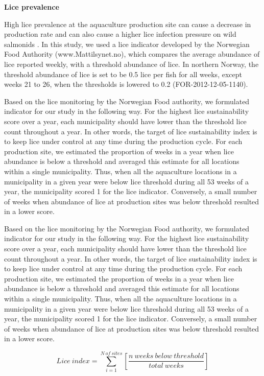 \documentclass[
]{book}
\begin{document}
\textbf{Lice prevalence}

High lice prevalence at the aquaculture production site can cause a decrease in production rate and can also cause a higher lice infection pressure on wild salmonids \citep{bjorn2001salmon, nilsen2017vurdering}.
In this study, we used a lice indicator developed by the Norwegian Food Authority (www.Mattilsynet.no), which compares the average abundance of lice reported weekly, with a threshold abundance of lice. In northern Norway, the threshold abundance of lice is set to be 0.5 lice per fish for all weeks, except weeks 21 to 26, when the thresholds is lowered to 0.2 (FOR-2012-12-05-1140).

Based on the lice monitoring by the Norwegian Food authority, we formulated indicator for our study in the following way. For the highest lice sustainability score over a year, each municipality should have lower than the threshold lice count throughout a year. In other words, the target of lice sustainability index is to keep lice under control at any time during the production cycle. For each production site, we estimated the proportion of weeks in a year when lice abundance is below a threshold and averaged this estimate for all locations within a single municipality. Thus, when all the aquaculture locations in a municipality in a given year were below lice threshold during all 53 weeks of a year, the municipality scored 1 for the lice indicator. Conversely, a small number of weeks when abundance of lice at production sites was below threshold resulted in a lower score.

Based on the lice monitoring by the Norwegian Food authority, we formulated indicator for our study in the following way. For the highest lice sustainability score over a year, each municipality should have lower than the threshold lice count throughout a year. In other words, the target of lice sustainability index is to keep lice under control at any time during the production cycle. For each production site, we estimated the proportion of weeks in a year when lice abundance is below a threshold and averaged this estimate for all locations within a single municipality. Thus, when all the aquaculture locations in a municipality in a given year were below lice threshold during all 53 weeks of a year, the municipality scored 1 for the lice indicator. Conversely, a small number of weeks when abundance of lice at production sites was below threshold resulted in a lower score.

\begin{equation}
Lice \ index = \sum_{i = 1}^{N \ of \ sites}[\frac{n \ weeks\ below \ threshold}{total\ weeks}]
 \label{eq:lice}
\end{equation}
\end{document}
